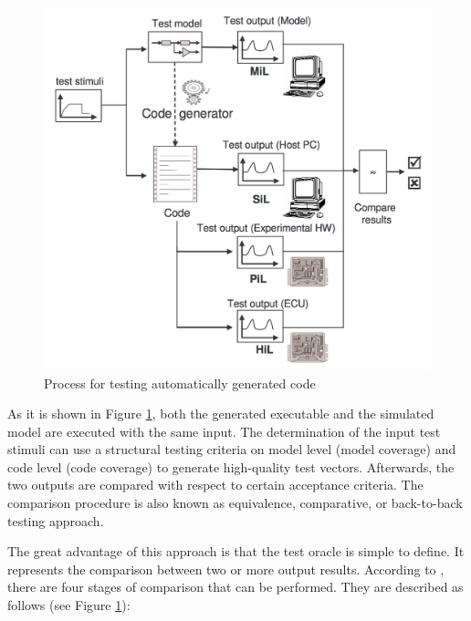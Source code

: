 \begin{figure}[h]
	\center
	\includegraphics[scale=0.6]{SOTA/fig/testing_process}
	\caption{Process for testing automatically generated code}
	\label{fig:Process for testing automatically generated code}
\end{figure}

As it is shown in Figure \ref{fig:Process for testing automatically generated code}, both the generated executable and the simulated model are executed with the same input. 
The determination of the input test stimuli can use a structural testing criteria on model level (model coverage) and code level (code coverage) to generate high-quality test vectors.
Afterwards, the two outputs are compared with respect
to certain acceptance criteria. The comparison procedure is also known as equivalence, comparative, or back-to-back testing approach\cite{vouk1990back,mckeeman1998differential}.

The great advantage of this approach is that the test oracle is simple to define. It represents the comparison between two or more output results. According to \cite{shokry2009model,stuermer2007systematic}, there are four stages of comparison that can be performed. They are described as follows (see Figure \ref{fig:Process for testing automatically generated code}):
 

